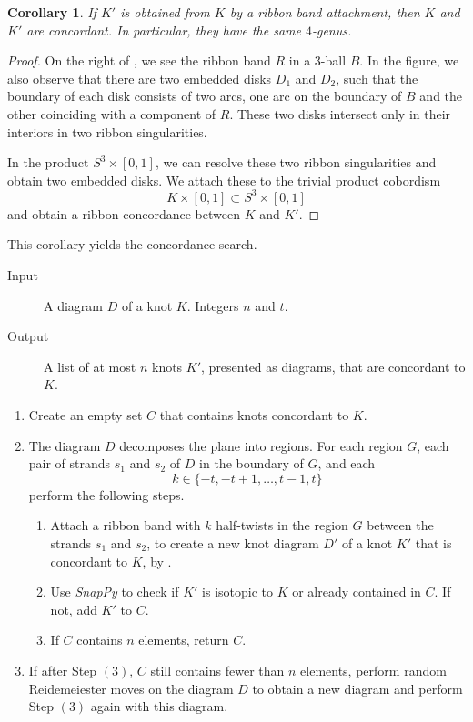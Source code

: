 \documentclass{amsart} %
\theoremstyle{thm}
\newtheorem{cor}[Theorem]{Corollary}
\theoremstyle{definition}
\numberwithin{equation}{section}
\begin{document}
 \begin{cor}\label{cor:ribbon}
     If $K'$ is obtained from $K$ by a ribbon band attachment, then $K$ and $K'$ are concordant. In particular, they have the same $4$-genus.
 \end{cor}

 \begin{proof}
    On the right of , we see the ribbon band $R$ in a $3$-ball $B$. In the figure, we also observe that there are two embedded disks $D_1$ and $D_2$, such that the boundary of each disk consists of two arcs, one arc on the boundary of $B$ and the other coinciding with a component of $R$. These two disks intersect only in their interiors in two ribbon singularities.

    In the product $S^3 \times [0,1]$, we can resolve these two ribbon singularities and obtain two embedded disks. We attach these to the trivial product cobordism 
\[
K \times [0,1] \subset S^3 \times [0,1]
\]
and obtain a ribbon concordance between $K$ and $K'$.
 \end{proof}

This corollary yields the concordance search.

\begin{algorithm}
\caption{Concordance search}
\label{prop:algo2}
\begin{description}
    \item[Input] A diagram $D$ of a knot $K$. Integers $n$ and $t$.
    \item[Output] A list of at most $n$ knots $K'$, presented as diagrams, that are concordant to $K$.
\end{description}

    \begin{enumerate}
        \item Create an empty set $C$ that contains knots concordant to $K$.
        \item The diagram $D$ decomposes the plane into regions. For each region $G$, each pair of strands $s_1$ and $s_2$ of $D$ in the boundary of $G$, and each 
        \[k\in\{-t,-t+1,\ldots,t-1,t\}\]
        perform the following steps.
        \begin{enumerate}
            \item Attach a ribbon band with $k$ half-twists in the region $G$ between the strands $s_1$ and $s_2$, to create a new knot diagram $D'$ of a knot $K'$ that is concordant to $K$, by .
            \item Use {\em SnapPy} to check if $K'$ is isotopic to $K$ or already contained in $C$. If not, add $K'$ to $C$.
            \item If $C$ contains $n$ elements, return $C$.
        \end{enumerate}
        \item If after Step $(3)$, $C$ still contains fewer than $n$ elements, perform random Reidemeiester moves on the diagram $D$ to obtain a new diagram and perform Step $(3)$ again with this diagram.
    \end{enumerate}
\end{algorithm}
\end{document}

